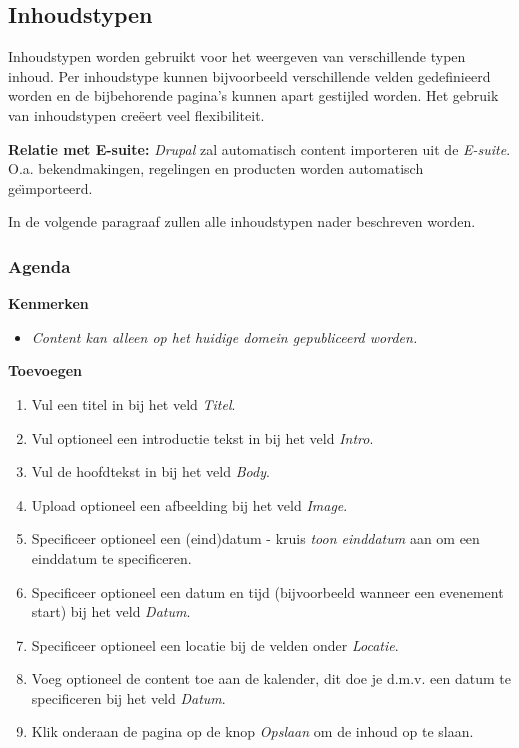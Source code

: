 \subsection{Inhoudstypen}\label{inhoudstypen}
Inhoudstypen worden gebruikt voor het weergeven van verschillende typen inhoud. Per inhoudstype kunnen bijvoorbeeld verschillende velden gedefinieerd worden en de bijbehorende pagina's kunnen apart gestijled worden. Het gebruik van inhoudstypen cre{\"{e}}ert veel flexibiliteit.

\textbf{Relatie met E-suite:}  \emph{Drupal} zal automatisch content importeren uit de \emph{E-suite}. O.a. bekendmakingen, regelingen en producten worden automatisch ge{\"\i}mporteerd. 

In de volgende paragraaf zullen alle inhoudstypen nader beschreven worden.

\subsubsection{Agenda}\label{agenda}

\textbf{Kenmerken}

\begin{itemize}
\item \emph{Content kan alleen op het huidige domein gepubliceerd worden.}
\end{itemize}

\textbf{Toevoegen}

\begin{enumerate}
\item Vul een titel in bij het veld \emph{Titel}.
\item Vul optioneel een introductie tekst in bij het veld \emph{Intro}.
\item Vul de hoofdtekst in bij het veld \emph{Body}.
\item Upload optioneel een afbeelding bij het veld \emph{Image}.
\item Specificeer optioneel een (eind)datum - kruis \emph{toon einddatum} aan om een einddatum te specificeren.
\item Specificeer optioneel een datum en tijd (bijvoorbeeld wanneer een evenement start) bij het veld \emph{Datum}.
\item Specificeer optioneel een locatie bij de velden onder \emph{Locatie}.
\item Voeg optioneel de content toe aan de kalender, dit doe je d.m.v. een datum te specificeren bij het veld \emph{Datum}.
\item Klik onderaan de pagina op de knop \emph{Opslaan} om de inhoud op te slaan.
\end{enumerate}

